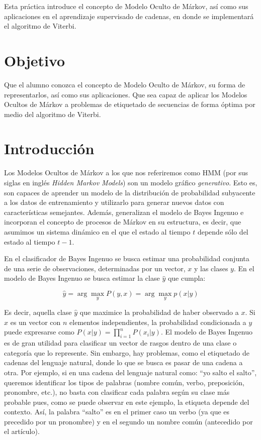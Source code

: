 
Esta práctica introduce el concepto de Modelo Oculto de Márkov, así como sus aplicaciones en el aprendizaje supervisado de cadenas, en donde se implementará el algoritmo de Viterbi.

\section{Objetivo}

Que el alumno conozca el concepto de Modelo Oculto de Márkov, su forma de representarlos, así como sus aplicaciones. Que sea capaz de aplicar los Modelos Ocultos de Márkov a problemas de etiquetado de secuencias de forma óptima por medio del algoritmo de Viterbi.


\section{Introducción}

Los Modelos Ocultos de Márkov a los que nos referiremos como HMM (por sus siglas en inglés \emph{Hidden Markov Models}) son un modelo gráfico \emph{generativo}.  Esto es, son capaces de aprender un modelo de la distribución de probabilidad subyacente a los datos de entrenamiento y utilizarlo para generar nuevos datos con características semejantes.  Además, generalizan el modelo de Bayes Ingenuo e incorporan el concepto de procesos de Márkov en su estructura, es decir, que asumimos un sistema dinámico en el que el estado al tiempo $t$ depende sólo del estado al tiempo $t-1$.

En el clasificador de Bayes Ingenuo se busca estimar una probabilidad conjunta de una serie de observaciones, determinadas por un vector, $x$ y las clases $y$. En el modelo de Bayes Ingenuo se busca estimar la clase $\hat{y}$ que cumpla:

$$ \hat{y} = \arg\max_y P(y,x) = \arg\max_y p(x|y)$$

Es decir, aquella clase $\hat{y}$ que maximice la probabilidad de haber observado a $x$.  Si $x$ es un vector con $n$ elementos independientes, la probabilidad condicionada a $y$ puede expresarse como $P(x|y) = \prod_{i=1}^n P(x_i | y)$. El modelo de Bayes Ingenuo es de gran utilidad para clasificar un vector de rasgos dentro de una clase o categoría que lo represente. Sin embargo, hay problemas, como el etiquetado de cadenas del lenguaje natural, donde lo que se busca es pasar de una cadena a otra. Por ejemplo, si en una cadena del lenguaje natural como: ``yo salto el salto'', queremos identificar los tipos de palabras (nombre común, verbo, preposición, pronombre, etc.), no basta con clasificar cada palabra según su clase más probable pues, como se puede observar en este ejemplo, la etiqueta depende del contexto. Así, la palabra ``salto'' es en el primer caso un verbo (ya que es precedido por un pronombre) y en el segundo un nombre común (antecedido por el artículo).

